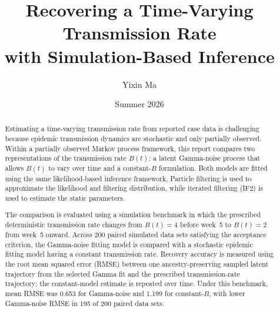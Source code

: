 \documentclass[11pt]{article}
\title{Recovering a Time-Varying Transmission Rate\\
with Simulation-Based Inference}
\author{Yixin Ma}
\date{Summer 2026}
\begin{document}
\maketitle

\begin{abstract}
Estimating a time-varying transmission rate from reported case data is challenging because epidemic transmission dynamics are stochastic and only partially observed. Within a partially observed Markov process framework, this report compares two representations of the transmission rate \(B(t)\): a latent Gamma-noise process that allows \(B(t)\) to vary over time and a constant-\(B\) formulation. Both models are fitted using the same likelihood-based inference framework. Particle filtering is used to approximate the likelihood and filtering distribution, while iterated filtering (IF2) is used to estimate the static parameters.

The comparison is evaluated using a simulation benchmark in which the prescribed deterministic transmission rate changes from \(B(t)=4\) before week~5 to \(B(t)=2\) from week~5 onward. Across 200 paired simulated data sets satisfying the acceptance criterion, the Gamma-noise fitting model is compared with a stochastic epidemic fitting model having a constant transmission rate. Recovery accuracy is measured using the root mean squared error (RMSE) between one ancestry-preserving sampled latent trajectory from the selected Gamma fit and the prescribed transmission-rate trajectory; the constant-model estimate is repeated over time. Under this benchmark, mean RMSE was 0.653 for Gamma-noise and 1.199 for constant-\(B\), with lower Gamma-noise RMSE in 195 of 200 paired data sets.
\end{abstract}

\tableofcontents
\clearpage








\clearpage
\appendix






{\small

}
\end{document}

